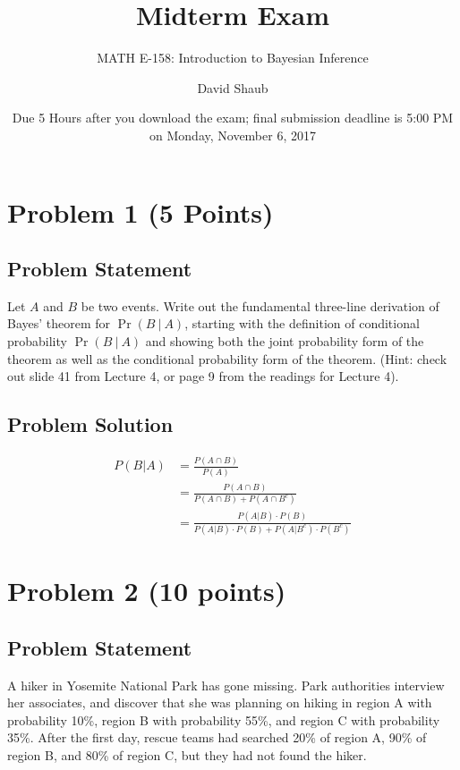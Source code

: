 \documentclass[12pt]{article}
\title{Midterm Exam}
\author{MATH E-158: Introduction to Bayesian Inference}
\author{David Shaub}
\date{Due 5 Hours after you download the exam; final submission deadline is 5:00 PM on Monday, November 6, 2017}
\theoremstyle{definition}
\begin{document}
	
	\maketitle


\section*{Problem 1 (5 Points)}


\subsection*{Problem Statement}

Let $A$ and $B$ be two events.
Write out the fundamental three-line derivation of Bayes' theorem for $\Pr(B\ |\ A)$, starting with the definition of conditional probability $\Pr(B\ |\ A)$ and showing both the joint probability form of the theorem as well as the conditional probability form of the theorem. (Hint: check out slide 41 from Lecture 4, or page 9 from the readings for Lecture 4).

\subsection*{Problem Solution}
\begin{align*}
P(B|A) &= \frac{P(A \cap B)}{P(A)}\\
&= \frac{P(A \cap B)}{P(A \cap B) + P(A \cap B^c)}\\
&= \frac{P(A|B) \cdot P(B)}{P(A|B) \cdot P(B) + P(A|B^c) \cdot P(B^c)}
\end{align*}




\newpage
\section*{Problem 2 (10 points)}

\subsection*{Problem Statement}

A hiker in Yosemite National Park has gone missing. Park authorities interview her associates, and discover that she was planning on hiking in region A with probability 10\%, region B with probability 55\%, and region C with probability 35\%. After the first day, rescue teams had searched 20\% of region A, 90\% of region B, and 80\% of region C, but they had not found the hiker.
\end{document}
